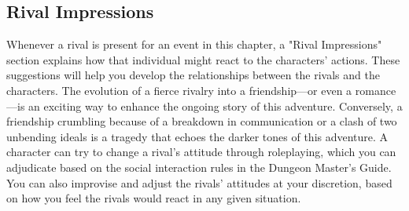 \documentclass[10pt,a4paper,twoside,bg=print,twocolumn,openany,nodeprecatedcode]{dndbook}
\begin{document}
\subsection{Rival Impressions}
Whenever a rival is present for an event in this chapter, a "Rival Impressions" section explains how that individual might react to the characters' actions. These suggestions will help you develop the relationships between the rivals and the characters. The evolution of a fierce rivalry into a friendship—or even a romance—is an exciting way to enhance the ongoing story of this adventure. Conversely, a friendship crumbling because of a breakdown in communication or a clash of two unbending ideals is a tragedy that echoes the darker tones of this adventure.
A character can try to change a rival's attitude through roleplaying, which you can adjudicate based on the social interaction rules in the Dungeon Master's Guide. You can also improvise and adjust the rivals' attitudes at your discretion, based on how you feel the rivals would react in any given situation.
\end{document}
